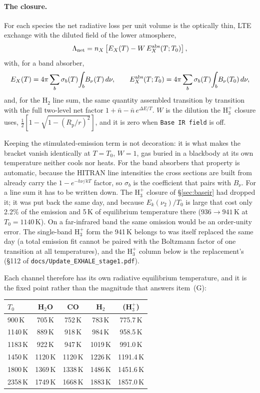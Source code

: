 \documentclass[english,a4paper]{my_memo}
\newcommand{\Rp}{R_{\mathrm{p}}}
\begin{document}
\paragraph{The closure.}
For each species the net radiative loss per unit volume is the optically thin,
LTE exchange with the diluted field of the lower atmosphere,
\begin{equation}
\Lambda_{\rm net} = n_X\left[E_X(T) - W\,E_X^{\rm abs}(T;T_0)\right],
\end{equation}
with, for a band absorber,
\begin{equation}
E_X(T) = 4\pi\sum_b \sigma_b(T)\!\int_b\! B_\nu(T)\,d\nu, \qquad
E_X^{\rm abs}(T;T_0) = 4\pi\sum_b \sigma_b(T)\!\int_b\! B_\nu(T_0)\,d\nu,
\end{equation}
and, for the H$_2$ line sum, the same quantity assembled transition by
transition with the full two-level net factor
$1+\bar n-\bar n\,e^{\Delta E/T}$. $W$ is the dilution the H$_3^+$ closure uses,
$\tfrac12[1-\sqrt{1-(\Rp/r)^2}]$, and it is zero when \texttt{Base IR field} is
off.

Keeping the stimulated-emission term is not decoration: it is what makes the
bracket vanish identically at $T=T_0$, $W=1$, gas buried in a blackbody at its
own temperature neither cools nor heats. For the band absorbers that property is
automatic, because the HITRAN line intensities the cross sections are built from
already carry the $1-e^{-h\nu/kT}$ factor, so $\sigma_b$ is the coefficient that
pairs with $B_\nu$. For a line sum it has to be written down. The H$_3^+$
closure of \S\ref{sec:baseir} had dropped it; it was put back the same day, and
because $E_k(\nu_2)/T_0$ is large that cost only 2.2\% of the emission and 5\,K of
equilibrium temperature there ($936\to941$\,K at $T_0=1140$\,K). On a
far-infrared band the same omission would be an order-unity error. The
single-band H$_3^+$ form the 941\,K belongs to was itself replaced the same day
(a total emission fit cannot be paired with the Boltzmann factor of one
transition at all temperatures), and the H$_3^+$ column below is the
replacement's (\S112 of \texttt{docs/Update\_EXHALE\_stage1.pdf}).

Each channel therefore has its own radiative equilibrium temperature, and it is
the fixed point rather than the magnitude that answers item~(G):

\begin{center}\small
\begin{tabular}{lcccc}
\toprule
$T_0$ & H$_2$O & CO & H$_2$ & (H$_3^+$) \\
\midrule
 900\,K & 705\,K & 752\,K & 783\,K  & 775.7\,K \\
1140\,K & 889\,K & 918\,K & 984\,K  & 958.5\,K \\
1183\,K & 922\,K & 947\,K & 1019\,K & 991.0\,K \\
1450\,K & 1120\,K & 1120\,K & 1226\,K & 1191.4\,K \\
1800\,K & 1369\,K & 1338\,K & 1486\,K & 1451.6\,K \\
2358\,K & 1749\,K & 1668\,K & 1883\,K & 1857.0\,K \\
\bottomrule
\end{tabular}
\end{center}
\end{document}
